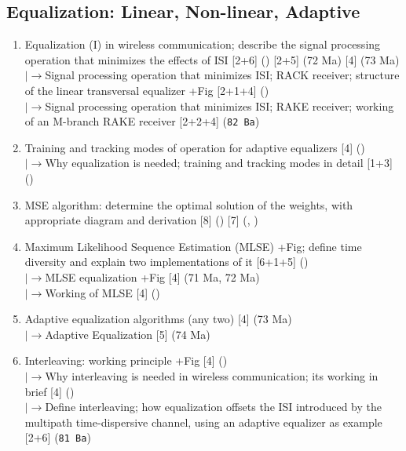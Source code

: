 \documentclass[12pt]{article}
\newcommand{\lb}{\\$\left|\rightarrow\right.$}
\begin{document}
  \subsection{Equalization: Linear, Non-linear, Adaptive}
    \begin{enumerate}[topsep=0pt, noitemsep]
      \item Equalization (I) in wireless communication; describe the signal processing operation
        that minimizes the effects of ISI \hfill [2+6] () [2+5] (72 Ma) [4] (73 Ma)
        \lb Signal processing operation that minimizes ISI; RACK receiver; structure of the
        linear transversal equalizer +Fig \hfill [2+1+4] ()
        \lb Signal processing operation that minimizes ISI; RAKE receiver; working of an
        M-branch RAKE receiver \hfill [2+2+4] (\texttt{82 Ba})
      \item Training and tracking modes of operation for adaptive equalizers \hfill [4] ()
        \lb Why equalization is needed; training and tracking modes in detail \hfill [1+3] ()
      \item MSE algorithm: determine the optimal solution of the weights, with appropriate
        diagram and derivation \hfill [8] () [7] (, )
      \item Maximum Likelihood Sequence Estimation (MLSE) +Fig;
        define time diversity and explain two implementations of it \hfill [6+1+5] ()
        \lb MLSE equalization +Fig \hfill [4] (71 Ma, 72 Ma)
        \lb Working of MLSE \hfill [4] ()
      \item Adaptive equalization algorithms (any two) \hfill [4] (73 Ma)
        \lb Adaptive Equalization \hfill [5] (74 Ma)
      \item Interleaving: working principle +Fig \hfill [4] ()
        \lb Why interleaving is needed in wireless communication; its working in brief \hfill [4] ()
        \lb Define interleaving; how equalization offsets the ISI introduced by the multipath
        time-dispersive channel, using an adaptive equalizer as example \hfill [2+6] (\texttt{81 Ba})
    \end{enumerate}
\end{document}
